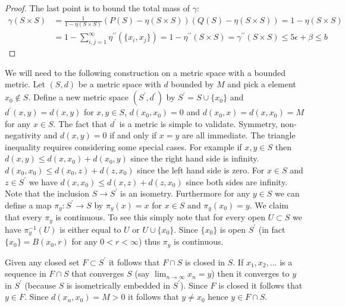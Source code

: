 \begin{proof}
The last point is to bound the total mass of $\gamma$:
\begin{align*}
\gamma(S \times S) &= \frac{1}{1 - \eta(S \times S)} (P(S) - \eta(S \times S)) (Q(S) - \eta(S \times S)) = 1 - \eta(S \times S) \\
&=1 - \sum_{i,j=1}^\infty \eta^{\prime \prime}( \lbrace x_i, x_j \rbrace ) = 1 - \eta^{\prime \prime}(S \times S) = \gamma^{\prime \prime}(S \times S) \leq 5\epsilon + \beta \leq b
\end{align*}
\end{proof}

We will need to the following construction on a metric space with a bounded metric.
Let $(S,d)$ be a metric space with $d$ bounded by $M$ and pick a element $x_0 \notin S$.  Define a new metric space $(S^\prime, d^\prime)$ by $S^\prime = S \cup \lbrace x_0 \rbrace$ and 
$d^\prime(x,y) = d(x,y)$ for $x, y \in S$, $d(x_0,x_0) = 0$ and $d(x_0,x) = d(x,x_0) = M$ for any $x \in S$.  The fact that $d^\prime$ is a metric is simple to validate.  Symmetry, non-negativity and $d(x,y) = 0$ if and only if $x=y$ are all immediate.  The triangle inequality requires considering some special cases.  For example if $x,y \in S$ then $d(x,y) \leq d(x,x_0) + d(x_0, y)$ since the right hand side is infinity.  $d(x_0, x_0) \leq d(x_0,z) + d(z,x_0)$ since the left hand side is zero.  For $x \in S$ and $z \in S^\prime$ we have $d(x,x_0) \leq d(x,z) + d(z,x_0)$ since both sides are infinity.   Note that the inclusion $S \to S^\prime$ is an isometry.  Furthermore for any $y \in S$ we can define a map $\pi_y : S^\prime \to S$ by $\pi_y(x) = x$ for $x \in S$ and $\pi_y(x_0) = y$.  We claim that every $\pi_y$ is continuous.  To see this simply note that for every open $U \subset S$ we have $\pi_y^{-1}(U)$ is either equal to $U$ or $U \cup \lbrace x_0 \rbrace$.  Since $\lbrace x_0 \rbrace$ is open $S^\prime$ (in fact $\lbrace x_0 \rbrace = B(x_0,r)$ for any $0 < r < \infty$) thus $\pi_y$ is continuous.

Given any closed set $F \subset S^\prime$ it follows that $F \cap S$ is closed in $S$.  If $x_1, x_2, \dotsc$ is a sequence in $F \cap S$ that converges $S$ (say $\lim_{n \to \infty} x_n = y$) then it converges to $y$ in $S^\prime$ (because $S$ is isometrically embedded in $S^\prime$).  Since $F$ is closed it follows that $y \in F$.  Since $d(x_n, x_0) =M > 0$ it follows that $y \neq x_0$ hence $y \in F \cap S$. 

